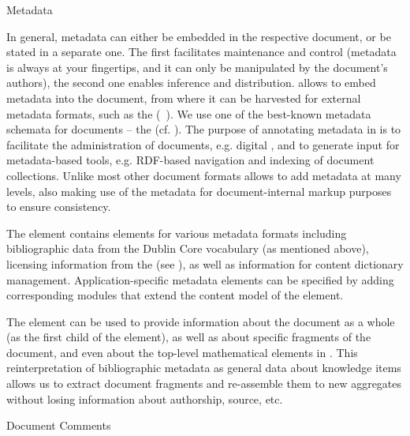\begin{omgroup}[id=omdoc-infrastructure,short=Document Infrastructure]
\begin{omgroup}[id=docmetadata]{Metadata}
\begin{module}[id=metadata]
In general, metadata can either be embedded in the respective document, or be stated in a
separate one. The first facilitates maintenance and control (metadata is always at your
fingertips, and it can only be manipulated by the document's authors), the second one
enables inference and distribution. {\omdoc} allows to embed metadata into the document,
from where it can be harvested for external metadata formats, such as the {\xml}
{} ({\rdf}~\cite{LasSwi:rdf99}).  We use one of the
best-known metadata schemata for documents -- the {\emph{}} (cf.
{}). The purpose of annotating metadata in {\omdoc} is to
facilitate the administration of documents, e.g.  digital {},
and to generate input for metadata-based tools, e.g.  RDF-based navigation and indexing of
document collections. Unlike most other document formats {\omdoc} allows to add metadata
at many levels, also making use of the metadata for document-internal markup purposes to
ensure consistency.
  
\begin{definition}[id=metadata.def]
  The {} element contains elements for various metadata formats including
  bibliographic data from the Dublin Core vocabulary (as mentioned above), licensing
  information from the {} (see
  {}), as well as information for {\openmath} content dictionary
  management. Application-specific metadata elements can be specified by adding
  corresponding {\omdoc} modules that extend the content model of the {}
  element.
\end{definition}

The {\omdoc} {} element can be used to provide information about the
document as a whole (as the first child of the {} element), as well as
about specific fragments of the document, and even about the top-level mathematical
elements in {\omdoc}. This reinterpretation of bibliographic metadata as general data
about knowledge items allows us to extract document fragments and re-assemble them to new
aggregates without losing information about authorship, source, etc.
\end{module}
\end{omgroup}

\begin{omgroup}[id=comment]{Document Comments}
\begin{module}[id=comments]


\end{module}
\end{omgroup}
\end{omgroup}
